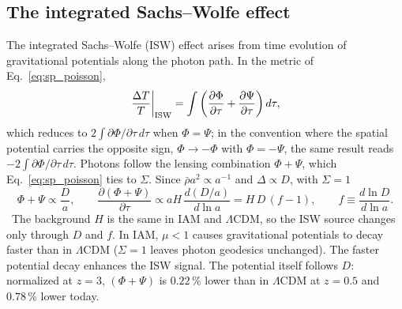 \subsection{The integrated Sachs--Wolfe effect}
The integrated Sachs--Wolfe (ISW) effect arises from time evolution of gravitational potentials along the photon path. In the metric of
Eq.~\eqref{eq:sp_poisson},
\begin{equation}\left.\frac{\Delta T}{T}\right|_{\rm ISW}=\int\left(\frac{\partial\Phi}{\partial\tau}+\frac{\partial\Psi}{\partial\tau}\right)d\tau ,\label{eq:sp_iswT}\end{equation}
which reduces to $2\int\partial\Phi/\partial\tau\,d\tau$ when $\Phi=\Psi$; in the convention where the spatial potential carries the
opposite sign, $\Phi\to-\Phi$ with $\Phi=-\Psi$, the same result reads $-2\int\partial\Phi/\partial\tau\,d\tau$. Photons follow the lensing combination $\Phi+\Psi$, which Eq.~\eqref{eq:sp_poisson}
ties to $\Sigma$. Since $\bar\rho a^2\propto a^{-1}$ and $\Delta\propto D$, with $\Sigma=1$
\begin{equation}\Phi+\Psi\propto\frac{D}{a},\qquad\frac{\partial(\Phi+\Psi)}{\partial\tau}\propto aH\,\frac{d(D/a)}{d\ln a}=H\,D\,(f-1),\qquad f\equiv\frac{d\ln D}{d\ln a}.\label{eq:sp_iswsrc}\end{equation}
\derived\ The background $H$ is the same in IAM and $\Lambda$CDM, so the ISW source changes only through $D$ and $f$. In IAM, $\mu<1$ causes
gravitational potentials to decay faster than in $\Lambda$CDM ($\Sigma=1$ leaves photon geodesics unchanged). The faster potential decay enhances
the ISW signal. The potential itself follows $D$: normalized at $z=3$, $(\Phi+\Psi)$ is $0.22\,\%$ lower than
in $\Lambda$CDM at $z=0.5$ and $0.78\,\%$ lower today. \calc

